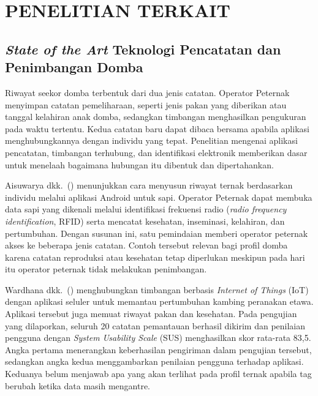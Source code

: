\chapter{PENELITIAN TERKAIT}

\section{\textit{State of the Art} Teknologi Pencatatan dan Penimbangan Domba}

Riwayat seekor domba terbentuk dari dua jenis catatan. {\setlength{\fboxsep}{1pt}\colorbox{revisilama}{Operator}} {\setlength{\fboxsep}{1pt}\colorbox{revisibaru}{Peternak}} menyimpan catatan pemeliharaan, seperti jenis pakan yang diberikan atau
tanggal kelahiran anak domba, sedangkan timbangan menghasilkan
pengukuran pada waktu tertentu. Kedua catatan baru dapat dibaca bersama apabila
aplikasi menghubungkannya dengan individu yang tepat. Penelitian mengenai aplikasi
pencatatan, timbangan terhubung, dan identifikasi elektronik memberikan dasar untuk
menelaah bagaimana hubungan itu dibentuk dan dipertahankan.

Aisuwarya dkk.~(\citeyear{aisuwarya2019rfid}) menunjukkan cara menyusun riwayat ternak
berdasarkan individu melalui aplikasi Android untuk sapi. {\setlength{\fboxsep}{1pt}\colorbox{revisilama}{Operator}} {\setlength{\fboxsep}{1pt}\colorbox{revisibaru}{Peternak}} dapat membuka data
sapi yang dikenali melalui identifikasi frekuensi radio (\textit{radio frequency
identification}, RFID) serta mencatat kesehatan, inseminasi, kelahiran, dan
pertumbuhan. Dengan susunan ini, satu pemindaian memberi {\setlength{\fboxsep}{1pt}\colorbox{revisilama}{operator}} {\setlength{\fboxsep}{1pt}\colorbox{revisibaru}{peternak}} akses ke beberapa
jenis catatan. Contoh tersebut relevan bagi profil domba karena catatan reproduksi
atau kesehatan tetap diperlukan meskipun pada hari itu {\setlength{\fboxsep}{1pt}\colorbox{revisilama}{operator}} {\setlength{\fboxsep}{1pt}\colorbox{revisibaru}{peternak}} tidak melakukan
penimbangan.

Wardhana dkk.~(\citeyear{wardhana2026pemantauan}) menghubungkan timbangan berbasis
\textit{Internet of Things} (IoT) dengan aplikasi seluler untuk memantau pertumbuhan
kambing peranakan etawa. Aplikasi tersebut juga memuat riwayat pakan dan kesehatan.
Pada pengujian yang dilaporkan, seluruh 20 catatan pemantauan berhasil dikirim dan
penilaian pengguna dengan \textit{System Usability Scale} (SUS) menghasilkan skor
rata-rata 83,5. Angka pertama menerangkan keberhasilan pengiriman dalam pengujian
tersebut, sedangkan angka kedua menggambarkan penilaian pengguna terhadap aplikasi.
Keduanya belum menjawab apa yang akan terlihat pada profil ternak apabila tag berubah
ketika data masih mengantre.

